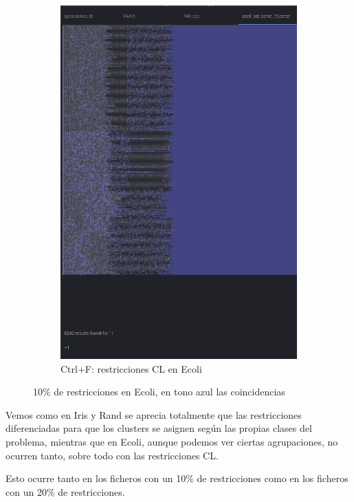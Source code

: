 \documentclass[12pt, spanish]{article}
\begin{document}
\begin{figure}[H]
\begin{subfigure}[b]{0.40\textwidth}
      \includegraphics[scale = 0.28]{rest_ecoli_10_-1.png}
 		 \caption{Ctrl+F: restricciones CL en Ecoli}
  		\label{fig:rest_ecoli_10_-1}
  \end{subfigure}
    \caption{10\% de restricciones en Ecoli, en tono azul las coincidencias}\label{fig:rest_ecoli_10}

\end{figure}

Vemos como en Iris y Rand se aprecia totalmente que las restricciones diferenciadas para que los clusters se asignen según las propias clases del problema, mientras que en Ecoli, aunque podemos ver ciertas agrupaciones, no ocurren tanto, sobre todo con las restricciones CL.

Esto ocurre tanto en los ficheros con un 10\% de restricciones como en los ficheros con un 20\% de restricciones.
\end{document}
